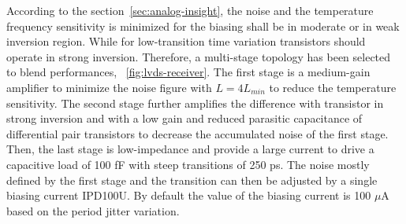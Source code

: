 According to the section~\ref{sec:analog-insight}, the noise and the temperature frequency sensitivity is minimized for the biasing shall be in moderate or in weak inversion region. While for low-transition time variation transistors should operate in strong inversion. Therefore, a multi-stage topology has been selected to blend performances, \figurename~\ref{fig:lvds-receiver}. The first stage is a medium-gain amplifier to minimize the noise figure with $L=4L_{min}$ to reduce the temperature sensitivity. The second stage further amplifies the difference with transistor in strong inversion and with a low gain and reduced parasitic capacitance of differential pair transistors to decrease the accumulated noise of the first stage. Then, the last stage is low-impedance and provide a large current to drive a capacitive load of 100 fF with steep transitions of 250 ps. The noise mostly defined by the first stage and the transition can then be adjusted by a single biasing current IPD100U. By default the value of the biasing current is 100 $\mu$A based on the period jitter variation.

